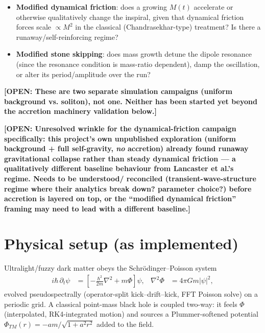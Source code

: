 \documentclass[11pt]{article}
\newcommand{\OPEN}[1]{\textcolor{orange!80!black}{\textbf{[OPEN: #1]}}}
\begin{document}
\begin{itemize}
  \item \textbf{Modified dynamical friction}: does a growing $M(t)$
    accelerate or otherwise qualitatively change the inspiral, given that
    dynamical friction forces scale $\propto M^2$ in the classical
    (Chandrasekhar-type) treatment? Is there a runaway/self-reinforcing
    regime?
  \item \textbf{Modified stone skipping}: does mass growth detune the
    dipole resonance (since the resonance condition is mass-ratio
    dependent), damp the oscillation, or alter its period/amplitude over
    the run?
\end{itemize}

\OPEN{These are two separate simulation campaigns (uniform background vs.
soliton), not one. Neither has been started yet beyond the accretion
machinery validation below.}

\OPEN{Unresolved wrinkle for the dynamical-friction campaign specifically:
this project's own unpublished exploration (uniform background + full
self-gravity, \emph{no} accretion) already found runaway gravitational
collapse rather than steady dynamical friction — a qualitatively different
baseline behaviour from Lancaster et al.'s regime. Needs to be understood/
reconciled (transient-wave-structure regime where their analytics break
down? parameter choice?) before accretion is layered on top, or the
``modified dynamical friction'' framing may need to lead with a different
baseline.}

\section{Physical setup (as implemented)}

Ultralight/fuzzy dark matter obeys the Schr\"odinger--Poisson system
\begin{align}
  i\hbar\,\partial_t \psi &= \left[-\frac{\hbar^2}{2m}\nabla^2 + m\Phi\right]\psi, &
  \nabla^2\Phi &= 4\pi Gm|\psi|^2,
\end{align}
evolved pseudospectrally (operator-split kick--drift--kick, FFT Poisson
solve) on a periodic grid. A classical point-mass black hole is coupled
two-way: it feels $\Phi$ (interpolated, RK4-integrated motion) and sources a
Plummer-softened potential $\Phi_{TM}(r) = -am/\sqrt{1+a^2r^2}$ added to the
field.
\end{document}
